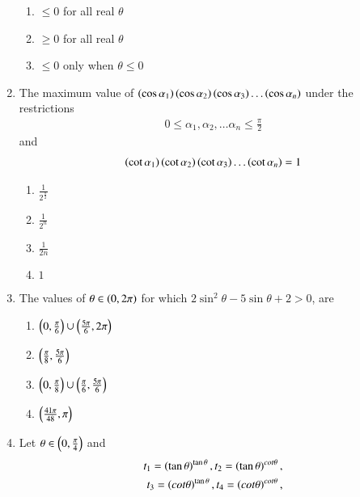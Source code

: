 \begin{enumerate}[label=\thesubsection.\arabic*,ref=\thesubsection.\theenumi]
\begin{multicols}{2}
\begin{enumerate}
                \item $\le0$ for all real $\theta$
                \item $\ge0$ for all real $\theta$
                \item $\le0$ only when $\theta\le0$
        \end{enumerate}
\end{multicols}
    \item The maximum value of $\left(\cos{\alpha_1}\right)\left(\cos{\alpha_2}\right)\left(\cos{\alpha_3}\right)\dots\left(\cos{\alpha_n}\right)$ under the restrictions
        \hfill{}
   	\begin{align*} 
		0\le\alpha_1,\alpha_2,\dots\alpha_n\le\frac{\pi}{2}
	\end {align*} and 
	\begin{align*}
		\left(\cot{\alpha_1}\right)\left(\cot{\alpha_2}\right)\left(\cot{\alpha_3}\right)\dots\left(\cot{\alpha_n}\right) = 1
	\end{align*}
        \begin{multicols}{4}
\begin{enumerate}
                \item $\frac{1}{2^{\frac{n}{2}}}$
                \item $\frac{1}{2^{n}}$
                \item $\frac{1}{2n}$
                \item $1$
        \end{enumerate}
\end{multicols}
%  
\item The values of $\theta \in \left(0,2\pi\right)$ for which $2\sin^2\theta - 5\sin\theta + 2 > 0$, are
\hfill{}
\begin{multicols}{4}
\begin{enumerate}
\item $\left(0,\frac{\pi}{6}\right)\cup\left(\frac{5\pi}{6},2\pi\right)$
\item $\left(\frac{\pi}{8},\frac{5\pi}{6}\right)$
\item $\left(0,\frac{\pi}{8}\right)\cup\left(\frac{\pi}{6},\frac{5\pi}{6}\right)$
\item $\left(\frac{41\pi}{48},\pi\right)$
\end{enumerate}
\end{multicols}
\item Let $\theta \in \left(0,\frac{\pi}{4}\right)$ and 
\begin{align*}
t_1 = \brak{\tan\theta}^{\tan\theta}, t_2 = \brak{\tan\theta}^{cot\theta},\\t_3 = \brak{cot\theta}^{\tan\theta}, t_4 = \brak{cot\theta}^{cot\theta},

\end{align*}
\end{enumerate}
